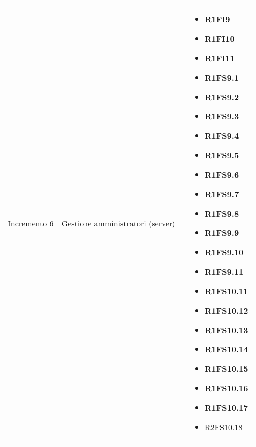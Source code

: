 {\begin{longtable}{C{3cm} C{4cm} C{4cm} C{4cm}}
Incremento 6 & Gestione amministratori (server) & 
& \begin{itemize}
    \item[ ] \textbf{R1FI9}
    \item[ ] \textbf{R1FI10}
    \item[ ] \textbf{R1FI11}
    \item[ ] \textbf{R1FS9.1}
    \item[ ] \textbf{R1FS9.2}
    \item[ ] \textbf{R1FS9.3}
    \item[ ] \textbf{R1FS9.4}
    \item[ ] \textbf{R1FS9.5}
    \item[ ] \textbf{R1FS9.6}
    \item[ ] \textbf{R1FS9.7}
    \item[ ] \textbf{R1FS9.8}
    \item[ ] \textbf{R1FS9.9}
    \item[ ] \textbf{R1FS9.10}
    \item[ ] \textbf{R1FS9.11}
    \item[ ] \textbf{R1FS10.11}
    \item[ ] \textbf{R1FS10.12}
    \item[ ] \textbf{R1FS10.13}
    \item[ ] \textbf{R1FS10.14}
    \item[ ] \textbf{R1FS10.15}
    \item[ ] \textbf{R1FS10.16}
    \item[ ] \textbf{R1FS10.17}
    \item[ ] R2FS10.18
\end{itemize}\\

\end{longtable}
}